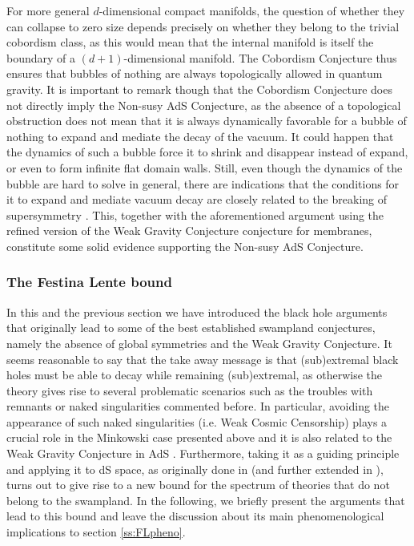 \documentclass[11pt,a4paper]{article}
\begin{document}
For more general $d$-dimensional compact manifolds, the question of whether they can collapse to zero size depends precisely on  whether they belong to the trivial cobordism class,  as this would mean that the internal manifold is itself the boundary of a $(d+1)$-dimensional manifold. The Cobordism Conjecture thus ensures that bubbles of nothing are always topologically allowed in quantum gravity. It is important to remark though that the Cobordism Conjecture does not directly imply the Non-susy AdS Conjecture, as the absence of a topological obstruction does not mean that it is always dynamically favorable for a bubble of nothing to expand and mediate the decay of the vacuum. It could happen that the dynamics of such a bubble force it to shrink and disappear instead of expand, or even to form infinite flat domain walls. Still, even though the dynamics of the bubble are hard to solve in general, there are indications that the conditions for it to expand and mediate vacuum decay are closely related to the breaking of supersymmetry \cite{GarciaEtxebarria:2020xsr}. This, together with the aforementioned argument using the refined version of the Weak Gravity Conjecture conjecture for membranes, constitute some solid evidence supporting the Non-susy AdS Conjecture.


\subsubsection*{The Festina Lente bound}

In this and the previous section we have introduced  the black hole arguments that originally lead to some of the best established swampland conjectures, namely the absence of global symmetries and the Weak Gravity Conjecture. It seems reasonable to say that the take away message is that (sub)extremal black holes must be able to decay while remaining (sub)extremal, as otherwise the theory  gives rise to several problematic scenarios such as the troubles with remnants or naked singularities commented before. In particular, avoiding the appearance of such naked singularities (i.e. Weak Cosmic Censorship) plays a crucial role in the Minkowski case presented above and it is also related to the Weak Gravity Conjecture in AdS \cite{Crisford:2017zpi,Crisford:2017gsb,Horowitz:2019eum}. Furthermore, taking it as a guiding principle and applying it to dS space, as originally done in \cite{Montero:2019ekk} (and further extended in \cite{Montero:2021otb}), turns out to give rise to a new bound for the spectrum of theories that do not belong to the swampland. In the following, we briefly present the arguments that lead to this bound and leave the discussion about its main phenomenological implications to section \ref{ss:FLpheno}.
\end{document}
